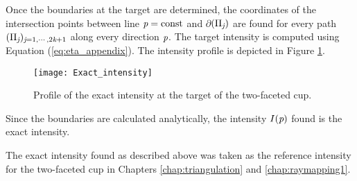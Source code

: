 Once the boundaries at the target are determined, the coordinates of the intersection points between line $\textit{p}=\textrm{const}$ and $\partial$$(\Pi_{\textit{j}})$ are found for every path $(\Pi_{\textit{j}})_{\textit{j}=1, \cdots, 2\textit{k}+1}$ along every direction $\textit{p}$. The target intensity is computed using Equation (\ref{eq:eta_appendix}). The intensity profile is depicted in Figure \ref{fig:intensity_cup_analytic}. 
\begin{figure}[htbp]
\centering
\texttt{[image: Exact\_intensity]}
\caption{Profile of the exact intensity at the target of the two-faceted cup.}
\label{fig:intensity_cup_analytic}
\end{figure}
Since the boundaries are calculated analytically, the intensity $I(\textit{p})$ found is the exact intensity.

The exact intensity found as described above was taken as the reference intensity for the two-faceted cup in Chapters \ref{chap:triangulation} and \ref{chap:raymapping1}.

